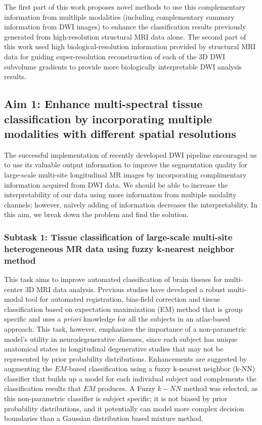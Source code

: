 The first part of this work proposes novel methods to use this complementary information from multliple modalities (including complementary summary information from DWI images) to enhance the classification results previously generated from high-resolution structural MRI data alone. The second part of this work used high biological-resolution information provided by structural MRI data for guiding  super-resolution reconstruction of each of the 3D DWI subvolume gradients to provide more biologically interpretable DWI analysis results.

\subsection{Aim 1: Enhance multi-spectral tissue classification by incorporating multiple modalities with different spatial resolutions}

The successful implementation of recently developed DWI pipeline encouraged us to use its valuable output information to improve the segmentation quality for large-scale multi-site longitudinal MR images by incorporating complimentary information acquired from DWI data.
We should be able to increase the interpretability of our data using more information from multiple modality channels; however, na\"{i}vely adding of information decreases the interpretability. In this aim, we break down the problem and find the solution.

\subsubsection{Subtask 1: Tissue classification of large-scale multi-site heterogeneous MR data using fuzzy k-nearest neighbor method}

This task aims to improve automated classification of brain tissues for multi-center 3D MRI data analysis. 
Previous studies have developed a robust multi-modal tool for automated registration, bias-field correction and tissue classification based on expectation maximization (EM) method \cite{Kim2013} that is group specific and uses a \emph{priori} knowledge for all the subjects in an atlas-based approach.
This task, however, emphasizes the importance of a non-parametric model's utility in neurodegenerative diseases, since each subject has unique anatomical states in longitudinal degenerative studies that may not be represented by prior probability distributions. Enhancements are suggested by augmenting the $EM$-based classification using a fuzzy k-nearest neighbor (k-NN) classifier that builds up a model for each individual subject and complements the classification results that $EM$ produces.
A Fuzzy $k-NN$ method was selected, as this non-parametric classifier is subject specific; it is not biased by prior probability distributions, and it potentially can model more complex decision boundaries than a Gaussian distribution based mixture method.

